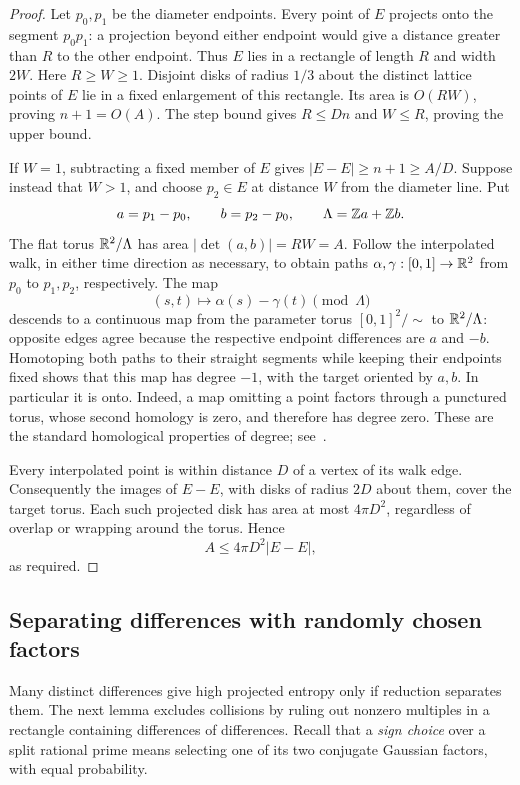 \begin{proof}
Let \(p_0,p_1\) be the diameter endpoints. Every point of \(E\) projects
onto the segment \(p_0p_1\): a projection beyond either endpoint would
give a distance greater than \(R\) to the other endpoint.
Thus \(E\) lies in a rectangle of length \(R\) and width \(2W\).
Here \(R\ge W\ge1\). Disjoint disks of radius \(1/3\) about the distinct
lattice points of \(E\) lie in a fixed enlargement of this rectangle.
Its area is \(O(RW)\), proving \(n+1=O(A)\).
The step bound gives \(R\le Dn\) and \(W\le R\), proving the upper bound.

If \(W=1\), subtracting a fixed member of \(E\) gives
\(|E-E|\ge n+1\ge A/D\).
Suppose instead that \(W>1\), and choose \(p_2\in E\) at distance \(W\)
from the diameter line. Put
\[
 a=p_1-p_0,\qquad b=p_2-p_0,\qquad
 \Lambda=\mathbb Z a+\mathbb Z b.
\]
The flat torus \(\mathbb R^2/\Lambda\) has area
\(|\det(a,b)|=RW=A\).
Follow the interpolated walk, in either time direction as necessary,
to obtain paths \(\alpha,\gamma:[0,1]\to\mathbb R^2\) from \(p_0\) to \(p_1,p_2\),
respectively. The map
\[
 (s,t)\longmapsto \alpha(s)-\gamma(t)\pmod{\Lambda}
\]
descends to a continuous map from the parameter torus
\([0,1]^2/\!\sim\) to \(\mathbb R^2/\Lambda\): opposite edges agree because
the respective endpoint differences are \(a\) and \(-b\).
Homotoping both paths to their straight segments while keeping their
endpoints fixed shows that this map has degree \(-1\), with the target
oriented by \(a,b\). In particular it is onto.
Indeed, a map omitting a point factors through a punctured torus,
whose second homology is zero, and therefore has degree zero.
These are the standard homological properties of degree;
see~\cite[Section 3.3, Theorem 3.26(a), Proposition 3.29, and Exercise 7]{Hatcher}.

Every interpolated point is within distance \(D\) of a vertex of its
walk edge. Consequently the images of \(E-E\), with disks of radius
\(2D\) about them, cover the target torus.
Each such projected disk has area at most \(4\pi D^2\), regardless of
overlap or wrapping around the torus. Hence
\[
 A\le 4\pi D^2 |E-E|,
\]
as required.
\end{proof}

\subsection{Separating differences with randomly chosen factors}

Many distinct differences give high projected entropy only if reduction
separates them. The next lemma excludes collisions by ruling out nonzero
multiples in a rectangle containing differences of differences.
Recall that a \emph{sign choice} over a split rational prime means
selecting one of its two conjugate Gaussian factors, with equal probability.

